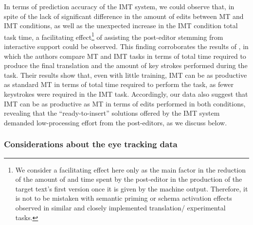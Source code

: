 \documentclass[output=paper]{langsci/langscibook}
\begin{document}
\largerpage[-1]
In terms of prediction accuracy of the IMT system, we could observe that, in spite of the lack of significant difference in the amount of edits between MT and IMT conditions, as well as the unexpected increase in the IMT condition total task time, a facilitating effect\footnote{ We consider a facilitating effect here only as the main factor in the reduction of the amount of  and time spent by the post-editor in the production of the target text's first version once it is given by the machine output. Therefore, it is not to be mistaken with semantic priming or schema activation effects observed in similar and closely implemented translation/  experimental tasks.} of assisting the post-editor stemming from interactive support could be observed. This finding corroborates the results of \citet{sanchis2014interactive}, in which the authors compare MT and IMT  tasks in terms of total time required to produce the final translation and the amount of key strokes performed during the task. Their results show that, even with little training, IMT  can be as productive as standard MT  in terms of total time required to perform the task, as fewer keystrokes were required in the IMT task. Accordingly, our data also suggest that IMT can be as productive as MT in terms of  edits performed in both conditions, revealing that the ``ready-to-insert'' solutions offered by the IMT system demanded low-processing effort from the post-editors, as we discuss below.


\subsubsection{Considerations about the eye tracking data\label{alves:sec:ConsiderationsAboutTheEyetracking}}
\end{document}
